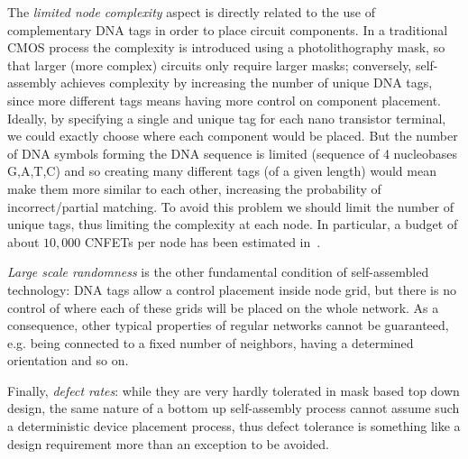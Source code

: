 The \emph{limited node complexity} aspect is directly
related to the use of complementary DNA tags in order to place circuit
components. In a traditional CMOS process the complexity is introduced
using a photolithography mask, so that larger (more complex) circuits
only require larger masks; conversely, self-assembly achieves
complexity by increasing the number of unique DNA tags, since more
different tags means having more control on component placement. Ideally, by specifying a single
and unique tag for each nano transistor terminal, we could exactly
choose where each component would be placed. But the number of DNA
symbols forming the DNA sequence is limited (sequence of 4 nucleobases
G,A,T,C) and so creating many different tags (of a given length) would
mean make them more similar to each other, increasing the probability
of incorrect/partial matching. To avoid this problem we should limit
the number of unique tags, thus limiting the complexity at each node.
In particular, a budget of about $10,000$ CNFETs per node has been
estimated in~\cite{liu_jetcs}.

\emph{Large scale randomness} is the other fundamental condition of
self-assembled technology: DNA tags allow a control placement inside
node grid, but there is no control of where each of these  grids will
be placed on the whole network. As a consequence, other typical
properties of regular networks cannot be guaranteed, e.g. being
connected to a fixed number of neighbors, having a determined
orientation and so on.

Finally, \emph{defect rates}: while they are very hardly tolerated in mask
based top down design, the same nature of a bottom up self-assembly
 process cannot assume such a deterministic device placement
process, thus defect tolerance is something like a design requirement
more than an exception to be avoided.

